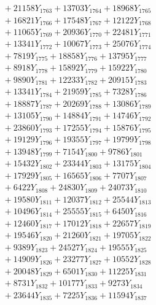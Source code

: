 \documentclass[a4paper,10pt]{article}
\begin{document}
{\begin{align}
&\;  + 21158 Y_{1763} + 13703 Y_{1764} + 18968 Y_{1765} \\[0.3ex]
&\;  + 16821 Y_{1766} + 17548 Y_{1767} + 12122 Y_{1768} \\[0.5ex]\allowbreak
&\;  + 11065 Y_{1769} + 20936 Y_{1770} + 22481 Y_{1771} \\[0.3ex]
&\;  + 13341 Y_{1772} + 10067 Y_{1773} + 25076 Y_{1774} \\[0.3ex]
&\;  + 7819 Y_{1775} + 18858 Y_{1776} + 13795 Y_{1777} \\[0.3ex]
&\;  + 8918 Y_{1778} + 15892 Y_{1779} + 15922 Y_{1780} \\[0.3ex]
&\;  + 9890 Y_{1781} + 12233 Y_{1782} + 20915 Y_{1783} \\[0.3ex]
&\;  + 13341 Y_{1784} + 21959 Y_{1785} + 7328 Y_{1786} \\[0.3ex]
&\;  + 18887 Y_{1787} + 20269 Y_{1788} + 13086 Y_{1789} \\[0.3ex]
&\;  + 13105 Y_{1790} + 14884 Y_{1791} + 14746 Y_{1792} \\[0.3ex]
&\;  + 23860 Y_{1793} + 17255 Y_{1794} + 15876 Y_{1795} \\[0.3ex]
&\;  + 19129 Y_{1796} + 19355 Y_{1797} + 19799 Y_{1798} \\[0.5ex]\allowbreak
&\;  + 13948 Y_{1799} + 7154 Y_{1800} + 9786 Y_{1801} \\[0.3ex]
&\;  + 15432 Y_{1802} + 23344 Y_{1803} + 13175 Y_{1804} \\[0.3ex]
&\;  + 17929 Y_{1805} + 16565 Y_{1806} + 7707 Y_{1807} \\[0.3ex]
&\;  + 6422 Y_{1808} + 24830 Y_{1809} + 24073 Y_{1810} \\[0.3ex]
&\;  + 19580 Y_{1811} + 12037 Y_{1812} + 25544 Y_{1813} \\[0.3ex]
&\;  + 10496 Y_{1814} + 25555 Y_{1815} + 6450 Y_{1816} \\[0.3ex]
&\;  + 12460 Y_{1817} + 17012 Y_{1818} + 22657 Y_{1819} \\[0.3ex]
&\;  + 19546 Y_{1820} + 21260 Y_{1821} + 19705 Y_{1822} \\[0.3ex]
&\;  + 9389 Y_{1823} + 24527 Y_{1824} + 19555 Y_{1825} \\[0.3ex]
&\;  + 14909 Y_{1826} + 23277 Y_{1827} + 10552 Y_{1828} \\[0.5ex]\allowbreak
&\;  + 20048 Y_{1829} + 6501 Y_{1830} + 11225 Y_{1831} \\[0.3ex]
&\;  + 8731 Y_{1832} + 10177 Y_{1833} + 9273 Y_{1834} \\[0.3ex]
&\;  + 23644 Y_{1835} + 7225 Y_{1836} + 11594 Y_{1837} \\[0.3ex]

\end{align}}
\end{document}
